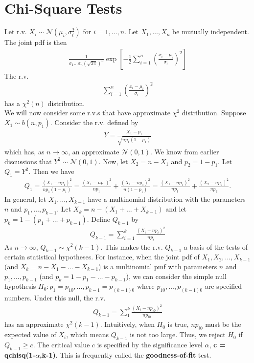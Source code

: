\documentclass{book}
\theoremstyle{definition}
\newcommand{\N}{\mathcal{N}}
\newcommand{\f}[2]{\frac{#1}{#2}}
\newcommand{\lp}{\left(}
\newcommand{\rp}{\right)}
\newcommand{\lb}{\left[}
\newcommand{\rb}{\right]}
\begin{document}
\section{Chi-Square Tests}

Let r.v. $X_i \sim \N(\mu_i,\sigma_i^2)$ for $i=1,\dots,n$. Let $X_1,\dots,X_n$ be mutually independent. The joint pdf is then
\begin{align}
\f{1}{\sigma_1\dots\sigma_n(\sqrt{2\pi})^{n}}\exp\lb -\f{1}{2}\sum^n_{i=1}\lp \f{x_i - \mu_i}{\sigma_i} \rp^2 \rb
\end{align}
The r.v. 
\begin{align}
\sum^n_{i=1}\lp \f{x_i - \mu_i}{\sigma_i} \rp^2
\end{align}
has a $\chi^2(n)$ distribution. \\

We will now consider some r.v.s that have approximate $\chi^2$ distribution. Suppose $X_1 \sim b(n,p_1)$. Consider the r.v. defined by
\begin{align}
Y = \f{X_1 - p_1}{\sqrt{np_1(1-p_1)}}
\end{align}
which has, as $n\to\infty$, an approximate $\N(0,1)$. We know from earlier discussions that $Y^2 \sim \N(0,1)$. Now, let $X_2 = n-X_1$ and $p_2 = 1-p_1$. Let $Q_1 = Y^2$. Then we have
\begin{align}
Q_1 = \f{(X_1 - np_1)^2}{np_1(1-p_1)} = \f{(X_1-np_1)^2}{np_1} + \f{(X_1 - np_1)^2}{n(1-p_1)} = \f{(X_1-np_1)^2}{np_1} + \f{(X_2-np_2)^2}{np_2}.
\end{align}
In general, let $X_1,\dots,X_{k-1}$ have a multinomial distribution with the parameters $n$ and $p_{1},\dots,p_{k-1}$. Let $X_k = n-(X_1+\dots+X_{k-1})$ and let $p_k = 1-(p_1+\dots+p_{k-1})$. Define $Q_{k-1}$ by
\begin{align}
Q_{k-1} = \sum^k_{i=1}\f{(X_i - np_i)^2}{np_i}
\end{align}
As $n\to \infty$, $Q_{k-1} \sim \chi^2(k-1)$. This makes the r.v. $Q_{k-1}$ a basis of the tests of certain statistical hypotheses. For instance, when the joint pdf of $X_1,X_2,\dots,X_{k-1}$ (and $X_k = n - X_1 - \dots - X_{k-1}$) is a multinomial pmf with parameters $n$ and $p_1,\dots,p_{k-1}$ (and $p_k = 1- p_1 - \dots - p_{k-1}$), we can consider the simple null hypothesis $H_0: p_1 = p_{10}, \dots, p_{k-1} = p_{(k-1)0}$ where $p_{10},\dots,p_{(k-1)0}$ are specified numbers. Under this null, the r.v.
\begin{align}
Q_{k-1}=\sum^k_{1}\f{(X_i - np_{i0})^2}{np_{i0}}
\end{align} 
has an approximate $\chi^2(k-1)$. Intuitively, when $H_0$ is true, $np_{i0}$ must be the expected value of $X_i$, which means $Q_{k-1}$ is not too large. Thus, we reject $H_0$ if $Q_{k-1} \geq c$. The critical value $c$ is specified by the significance level $\alpha$, \textbf{c = qchisq(1-$\alpha$,k-1)}. This is frequently called the \textbf{goodness-of-fit} test.\\
\end{document}
